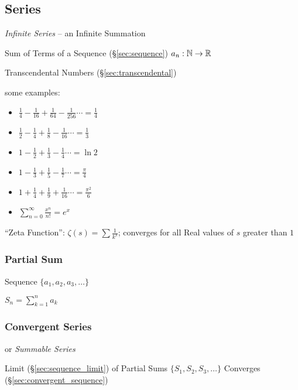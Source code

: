 \subsection{Series}\label{sec:series}

\emph{Infinite Series} -- an Infinite Summation

Sum of Terms of a Sequence (\S\ref{sec:sequence}) $a_n : \mathbb{N}
\rightarrow \mathbb{R}$

Transcendental Numbers (\S\ref{sec:transcendental})

some examples:
\begin{itemize}
  \item $\frac{1}{4} - \frac{1}{16} + \frac{1}{64} - \frac{1}{256} \cdots
    = \frac{1}{4}$
  \item $\frac{1}{2} - \frac{1}{4} + \frac{1}{8} - \frac{1}{16} \cdots
    = \frac{1}{3}$
  \item $1 - \frac{1}{2} + \frac{1}{3} - \frac{1}{4} \cdots  = \ln{2}$
  \item $1 - \frac{1}{3} + \frac{1}{5} - \frac{1}{7} \cdots  = \frac{\pi}{4}$
  \item $1 + \frac{1}{4} + \frac{1}{9} + \frac{1}{16} \cdots = \frac{\pi^2}{6}$
  \item $\sum_{n=0}^\infty \frac{x^n}{n!} = e^x$
\end{itemize}

``Zeta Function'': $\zeta(s) = \sum \frac{1}{k^s}$; converges for all Real
values of $s$ greater than $1$



\subsubsection{Partial Sum}\label{sec:partial_sum}

Sequence $\{ a_1, a_2, a_3, \ldots \}$

$S_n = \sum_{k=1}^n a_k$



\subsubsection{Convergent Series}\label{sec:convergent_series}

or \emph{Summable Series}

Limit (\S\ref{sec:sequence_limit}) of Partial Sums $\{ S_1, S_2, S_3,
\ldots \}$ Converges (\S\ref{sec:convergent_sequence})

